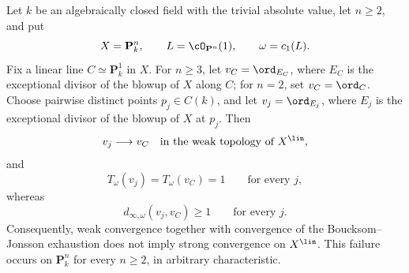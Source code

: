 \begin{theorem}
\label{thm:ch49-global-radon-riesz-counterexample}
Let \(k\) be an algebraically closed field with the trivial absolute value,
let \(n\ge2\), and put
\[
             X=\mathbf P^n_k,
             \qquad L=\cO_{\mathbf P^n}(1),
             \qquad \omega=c_1(L).
\]
Fix a linear line \(C\simeq\mathbf P^1_k\) in \(X\).  For \(n\ge3\),
let \(v_C=\ord_{E_C}\), where \(E_C\) is the exceptional divisor of the
blowup of \(X\) along \(C\); for \(n=2\), set \(v_C=\ord_C\).  Choose
pairwise distinct points \(p_j\in C(k)\), and let \(v_j=\ord_{E_j}\), where
\(E_j\) is the exceptional divisor of the blowup of \(X\) at \(p_j\).  Then
\[
              v_j\longrightarrow v_C
              \quad\text{in the weak topology of }X^{\lin},
\]
and
\[
              T_\omega(v_j)=T_\omega(v_C)=1
              \qquad\text{for every }j,
\]
whereas
\[
              d_{\infty,\omega}(v_j,v_C)\ge1
              \qquad\text{for every }j.
\]
Consequently, weak convergence together with convergence of the
Boucksom--Jonsson exhaustion does not imply strong convergence on
\(X^{\lin}\).  This failure occurs on \(\mathbf P^n_k\) for every
\(n\ge2\), in arbitrary characteristic.
\end{theorem}
